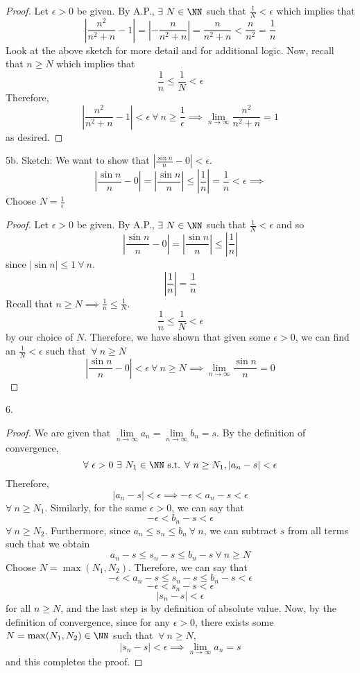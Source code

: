 \documentclass[12pt]{scrartcl}
\begin{document}
\begin{proof}

Let $\epsilon > 0$ be given. By A.P., $\exists \ N \in \NN$ such that $\frac{1}{N} < \epsilon$
which implies that 
\[|\frac{n^2}{n^2 + n} - 1| = |-\frac{n}{n^2 + n}| = \frac{n}{n^2 + n} < \frac{n}{n^2} = \frac{1}{n}\]
Look at the above sketch for more detail and for additional logic. Now, recall that 
$n \geq N$ which implies that 
\[\frac{1}{n} \leq \frac{1}{N} < \epsilon\]
Therefore,
\[|\frac{n^2}{n^2 + n} - 1| < \epsilon \ \forall \ n \geq \frac{1}{\epsilon} \implies \lim_{n\to\infty}\frac{n^2}{n^2 + n} = 1\]
as desired.

\end{proof}

5b. Sketch: We want to show that $|\frac{\sin n}{n} - 0| < \epsilon$. 
\[|\frac{\sin n}{n} - 0| = |\frac{\sin n}{n}| \leq |\frac{1}{n}| = \frac{1}{n} < \epsilon \implies\]
Choose $N = \frac{1}{\epsilon}$

\begin{proof}
  
  Let $\epsilon > 0$ be given. By A.P., $\exists \ N \in \NN$ such that $\frac{1}{N} < \epsilon$ and so 
  \[|\frac{\sin n}{n} - 0| = |\frac{\sin n}{n}| \leq |\frac{1}{n}|\]
  since $|\sin n| \leq 1 \ \forall \ n$.
  \[|\frac{1}{n}| = \frac{1}{n}\]
  Recall that $n \geq N \implies \frac{1}{n} \leq \frac{1}{N}$.
  \[\frac{1}{n} \leq \frac{1}{N} < \epsilon\]
  by our choice of $N$. Therefore, we have shown that given some $\epsilon > 0$, we can find an 
  $\frac{1}{N} < \epsilon$ such that $\ \forall \ n \geq N$
  \[|\frac{\sin n}{n } - 0| < \epsilon \ \forall \ n \geq N \implies \lim_{n\to\infty}\frac{\sin n}{n} = 0\] 

\end{proof}

\newpage

6. 

\begin{proof}

\hfill

We are given that $\underset{n\to\infty}{\lim} a_n = \underset{n\to\infty}{\lim} b_n = s$. 
By the definition of convergence,
\[\forall \ \epsilon > 0 \ \exists \ N_1 \in \NN \text{ s.t. } \forall \ n \geq N_1, |a_n - s| < \epsilon\]
Therefore, 
\[|a_n - s| < \epsilon \implies -\epsilon < a_n - s < \epsilon\]
$\forall \ n \geq N_1$.
Similarly, for the same $\epsilon > 0$, we can say that 
\[-\epsilon < b_n - s < \epsilon\]
$\forall \ n \geq N_2$. Furthermore, since $a_n \leq s_n \leq b_n \ \forall \ n$, we can subtract $s$ from all terms such that 
we obtain 
\[a_n - s\leq s_n - s\leq b_n - s \ \forall \ n \geq N\]
Choose $N = \max(N_1, N_2)$. Therefore, we can say that 
\[-\epsilon < a_n - s \leq s_n - s \leq b_n - s < \epsilon\]
\[-\epsilon < s_n - s < \epsilon\]
\[|s_n - s| < \epsilon\]
for all $n \geq N$, and the last step is by definition of absolute value. Now, by the definition of convergence, 
since for any $\epsilon > 0$, there exists some $N = \max(N_1, N_2) \in \NN$ such that 
$\ \forall \ n \geq N$,
\[|s_n - s| < \epsilon \implies \lim_{n\to\infty}a_n = s\]
and this completes the proof.

\end{proof}
\end{document}
